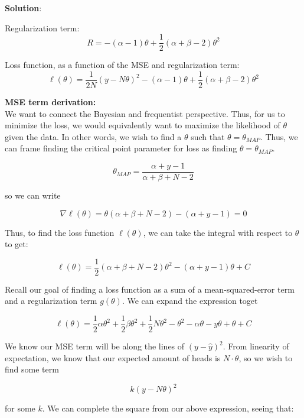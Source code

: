 \documentclass[submit]{../harvardml}
\newenvironment{answer}{
    \vspace{2mm}
    \color{blue}\noindent\textbf{Solution}:
}{}
\begin{document}
\begin{answer}
\begin{enumerate}
\begin{enumerate}
              Regularization term:
              \[
                R = -(\alpha - 1)\theta + \frac{1}{2}(\alpha + \beta - 2)\theta^2
              \]

              Loss function, as a function of the MSE and regularization term:
              \[
                \ell(\theta)  = \frac{1}{2N}(y - N\theta)^2 - (\alpha - 1)\theta + \frac{1}{2}(\alpha + \beta - 2)\theta^2
              \]

              \textbf{MSE term derivation:}\\

            We want to connect the Bayesian and frequentist perspective. Thus, for us to minimize the loss, we would equivalently want to maximize the likelihood of $\theta$ given the data. In other words, we wish to find a $\theta$ such that $\theta=\theta_{MAP}$. Thus, we can frame finding the critical point parameter for loss as finding $\theta=\theta_{MAP}$.

            \[
            \theta_{MAP} =\frac{\alpha + y -1}{\alpha + \beta + N - 2} 
            \]

            so we can write

            \[
              \nabla \ell(\theta) =\theta({\alpha + \beta + N - 2}) - (\alpha + y -1) = 0
            \]

            Thus, to find the loss function $\ell(\theta)$, we can take the integral with respect to $\theta$ to get:

            \[
              \ell(\theta) = \frac{1}{2}(\alpha + \beta + N - 2)\theta^2 - (\alpha + y -1)\theta + C
            \]

            Recall our goal of finding a loss function as a sum of a mean-squared-error term and a regularization term $g(\theta)$. We can expand the expression toget

            \[
            \ell(\theta) = \frac{1}{2} \alpha \theta^2 + \frac{1}{2}\beta\theta^2 + \frac{1}{2}N\theta^2 - \theta^2 - \alpha\theta - y\theta + \theta + C
            \]

            We know our MSE term will be along the lines of $(y - \hat{y})^2$. From linearity of expectation, we know that our expected amount of heads is $N\cdot \theta$, so we wish to find some term

            \[
            k(y - N\theta)^2
            \]

            for some $k$. We can complete the square from our above expression, seeing that:


\end{enumerate}
\end{enumerate}
\end{answer}
\end{document}
